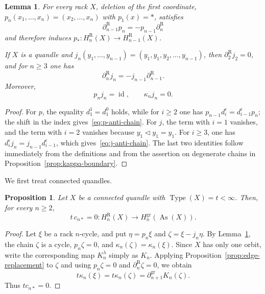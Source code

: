 \documentclass[10pt,a4paper]{amsart}
\newtheorem{proposition}[theorem]{Proposition}
\newtheorem{lemma}[theorem]{Lemma}
\DeclareMathOperator{\As}{As}
\DeclareMathOperator{\Type}{Type}
\newcommand{\gr}{\mathrm{gr}}
\newcommand{\R}{\mathrm R}
\begin{document}
\begin{lemma}
\label{lem:auxiliary-maps}
For every rack $X$, deletion of the first coordinate, $p_n(x_1,\ldots,x_n)=(x_2,\ldots,x_n)$ with $p_1(x)=*$, satisfies
\begin{equation}
 \partial_{n-1}^\R p_n=-p_{n-1}\partial_n^\R
 \label{eq:p-anti-chain}
\end{equation}
and therefore induces $p_*\colon H_n^\R(X)\to H_{n-1}^\R(X)$.

If $X$ is a quandle and $j_n(y_1,\ldots,y_{n-1})=(y_1,y_1,y_2,\ldots,y_{n-1})$, then $\partial_2^\R j_2=0$, and for $n\ge3$ one has
\begin{equation}
 \partial_n^\R j_n=-j_{n-1}\partial_{n-1}^\R.
 \label{eq:j-anti-chain}
\end{equation}
Moreover,
\[
p_nj_n=\operatorname{id},
 \qquad
 \kappa_nj_n=0.
\]
\end{lemma}

\begin{proof}
For $p$, the equality $d_1^1=d_1^0$ holds, while for $i\ge2$ one has $p_{n-1}d_i^\epsilon=d_{i-1}^\epsilon p_n$; the shift in the index gives~\eqref{eq:p-anti-chain}. For $j$, the term with $i=1$ vanishes, and the term with $i=2$ vanishes because $y_1\lhd y_1=y_1$. For $i\ge3$, one has $d_i^\epsilon j_n=j_{n-1}d_{i-1}^\epsilon$, which gives~\eqref{eq:j-anti-chain}. The last two identities follow immediately from the definitions and from the assertion on degenerate chains in Proposition~\ref{prop:kappa-boundary}.
\end{proof}

We first treat connected quandles.

\begin{proposition}
\label{prop:connected-quandle-annihilation}
Let $X$ be a connected quandle with $\Type(X)=t<\infty$. Then, for every $n\ge2$,
\[
        t\,c_{n*}=0
        \colon H_n^\R(X)\longrightarrow H_n^{\gr}(\As(X)).
\]
\end{proposition}

\begin{proof}
Let $\xi$ be a rack $n$-cycle, and put $\eta=p_n\xi$ and
$\zeta=\xi-j_n\eta$. By Lemma~\ref{lem:auxiliary-maps}, the chain $\zeta$ is a cycle, $p_n\zeta=0$, and $\kappa_n(\zeta)=\kappa_n(\xi)$.
Since $X$ has only one orbit, write the corresponding map $K_n^\lambda$ simply as $K_n$. Applying Proposition~\ref{prop:edge-replacement} to $\zeta$ and using $p_n\zeta=0$ and $\partial_n^\R\zeta=0$, we obtain
\[
 t\kappa_n(\xi)=t\kappa_n(\zeta)=\partial_{n+1}^{\gr}K_n(\zeta).
\]
Thus $t c_{n*}=0$.
\end{proof}
\end{document}
